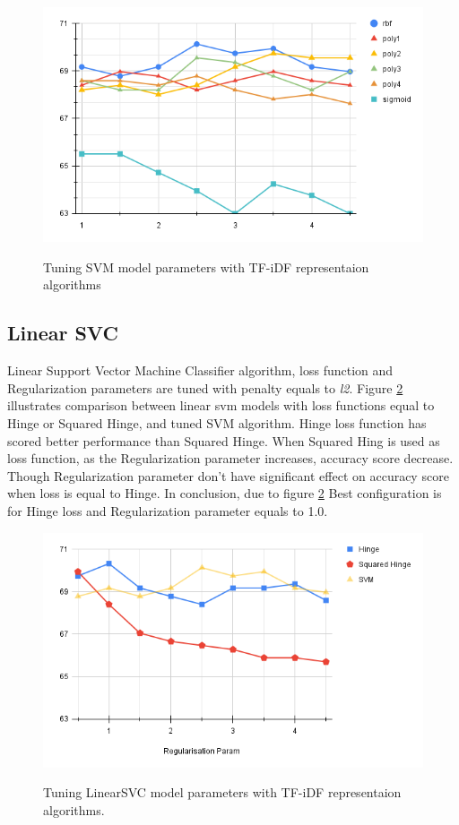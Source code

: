 \begin{figure}%
	\centering
	{\includegraphics[width=12.5cm]{statistics/svm.png} }
	\caption{Tuning SVM model parameters with TF-iDF representaion algorithms}%
	\label{fig:svm}%
\end{figure}

\subsection{Linear SVC}
Linear Support Vector Machine Classifier algorithm, loss function and Regularization parameters are tuned with penalty equals to \textit{l2}. Figure \ref{fig:linearsvm} illustrates comparison between linear svm models with loss functions equal to Hinge or Squared Hinge, and tuned SVM algorithm. Hinge loss function has scored better performance than Squared Hinge. When Squared Hing is used as loss function, as the Regularization parameter increases, accuracy score decrease. Though Regularization parameter don't have significant effect on accuracy score when loss is equal to Hinge. In conclusion, due to figure \ref{fig:linearsvm} Best configuration is for Hinge loss and Regularization parameter equals to 1.0. 
\begin{figure}%
	\centering
	{\includegraphics[width=12.5cm]{statistics/linearsvm.png} }
	\caption{Tuning LinearSVC model parameters with TF-iDF representaion algorithms.}%
	\label{fig:linearsvm}%
\end{figure}
